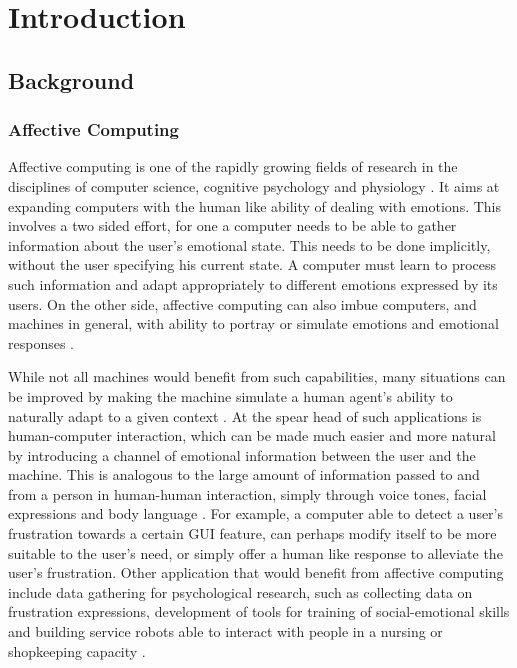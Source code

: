 \documentclass[12pt, a4paper, fleqn]{memoir}%
\begin{document}
\cleardoublepage
\rmfamily
\normalfont
{}
\pagestyle{headings}
\tableofcontents


\mainmatter

\chapter{Introduction}
\label{chap:Introduction}

\section{Background}
\subsection{Affective Computing}
Affective computing is one of the rapidly growing fields of research in the disciplines of computer science, cognitive psychology and physiology \cite{tao2005affective}. It aims at expanding computers with the human like ability of dealing with emotions. This involves a two sided effort, for one a computer needs to be able to gather information about the user's emotional state. This needs to be done implicitly, without the user specifying his current state. A computer must learn to process such information and adapt appropriately to different emotions expressed by its users. On the other side, affective computing can also imbue computers, and machines in general, with ability to portray or simulate emotions and emotional responses \cite{picard2003affective, picard1999affective}. 

While not all machines would benefit from such capabilities, many situations can be improved by making the machine simulate a human agent's ability to naturally adapt to a given context \cite{picard1999affective}. At the spear head of such applications is human-computer interaction, which can be made much easier and more natural by introducing a  channel of emotional information between the user and the machine. This is analogous to the large amount of information passed to and from a person in human-human interaction, simply through voice tones, facial expressions and body language \cite{cowie2001emotion}. For example, a computer able to detect a user's frustration towards a certain GUI feature, can perhaps modify itself to be more suitable to the user's need, or simply offer a human like response to alleviate the user's frustration. Other application that would benefit from affective computing include data gathering for psychological research, such as collecting data on frustration expressions, development of tools for training of social-emotional skills and building service robots able to interact with people in a nursing or shopkeeping capacity \cite{picard1999affective}.
\end{document}

